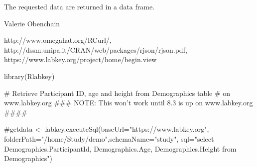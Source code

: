 \documentclass{article}
\begin{document}
\begin{Value}
The requested data are returned in a data frame.
\end{Value}
\begin{Author}\relax
Valerie Obenchain
\end{Author}
\begin{References}\relax
http://www.omegahat.org/RCurl/, 
http://dssm.unipa.it/CRAN/web/packages/rjson/rjson.pdf,
https://www.labkey.org/project/home/begin.view
\end{References}
\begin{SeeAlso}\relax
{}
\end{SeeAlso}
\begin{Examples}
\begin{ExampleCode}

library(Rlabkey)

# Retrieve Participant ID, age and height from Demographics table
# on www.labkey.org
### NOTE: This won't work until 8.3 is up on www.labkey.org ####

#getdata <- labkey.executeSql(baseUrl="https://www.labkey.org", folderPath="/home/Study/demo",schemaName="study", sql="select Demographics.ParticipantId, Demographics.Age, Demographics.Height from Demographics")

\end{ExampleCode}
\end{Examples}
\end{document}
